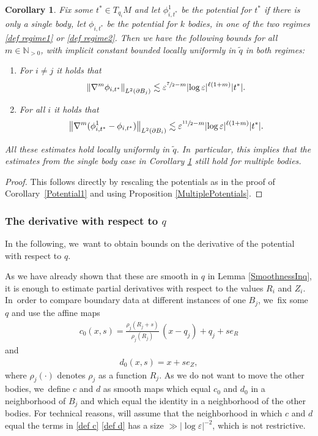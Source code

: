 \documentclass[JEP,XML,SOM,Unicode,published]{cedram}
\let\epsilon\varepsilon
\newtheorem{corollary}[theorem]{Corollary}
\theoremstyle{definition}
\newcommand\N{\mathbb{N}}
\newcommand\norm[1]{\left\lVert #1\right\rVert}
\newcommand\eq{=}
\let\de\partial
\let\eps\epsilon
\begin{document}
\begin{corollary}\label{MultPotSpec}
Fix some $t^*\in T_{q_i}M$ and let $\phi_{i,t^*}^1$ be the potential for $t^*$ if there is only a single body, let $\phi_{i,t^*}$ be the potential for $k$ bodies, in one of the two regimes \eqref{def regime1} or \eqref{def regime2}. Then we have the following bounds for all $m\in \N_{>0}$, with implicit constant bounded locally uniformly in $\tilde{q}$ in both regimes:
\begin{enumerate}
\item\label{MultPotSpeca}
For $i\neq j$ it holds that
\begin{align*}
\norm{\nabla^m\phi_{i,t^*}}_{L^2(\de B_j)}\lesssim \eps^{\sfrac{7}{2}-m}|{\log\eps}|^{\ell(1+m)}|t^*|.
\end{align*}

\item\label{MultPotSpecb}
For all $i$ it holds that
\begin{align*}
\norm{\nabla^m(\phi_{i,t^*}^1-\phi_{i,t^*})}_{L^2(\de B_{i})}\lesssim \eps^{\sfrac{11}{2}-m}|{\log\eps}|^{\ell(1+m)}|t^*|.
\end{align*}
\end{enumerate}
All these estimates hold locally uniformly in $\tilde{q}$. In~particular, this implies that the estimates from the single body case in Corollary \ref{MultPotSpec} still hold for multiple bodies.
\end{corollary}
\begin{proof}
This follows directly by rescaling the potentials as in the proof of Corollary~\ref{Potential1} and using Proposition \ref{MultiplePotentials}.
\end{proof}

\subsubsection{The derivative with respect to $q$}\label{sec q deri}

In the following, we~want to obtain bounds on the derivative of the potential with respect to $q$.

As we have already shown that these are smooth in $q$ in Lemma \ref{SmoothnessInq}, it is enough to estimate partial derivatives with respect to the values $R_i$ and $Z_i$. In~order to compare boundary data at different instances of one $B_j$, we~fix some $q$ and use the affine maps
\begin{align}\label{def c}
c_0(x,s)\eq\frac{\rho_j(R_j+s)}{\rho_j(R_j)}\,(x-q_j)+q_j+se_R
\end{align}
and
\begin{align}\label{def d}
d_0(x,s)\eq x+se_Z,
\end{align}
where $\rho_j(\cdot)$ denotes $\rho_j$ as a function $R_j$. As we do not want to move the other bodies, we~define $c$ and $d$ as smooth maps which equal $c_0$ and $d_0$ in a neighborhood of $B_j$ and which equal the identity in a neighborhood of the other bodies. For technical reasons, will assume that the neighborhood in which $c$ and $d$ equal the terms in \eqref{def c} \resp \eqref{def d} has a size $\gg|{\log\eps}|^{-2}$, which is not restrictive.
\end{document}
